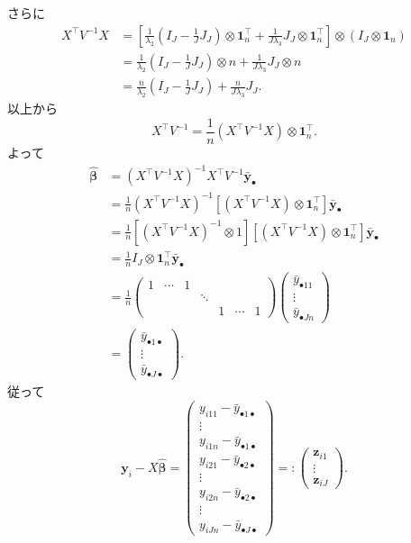 さらに
\begin{align*}
  X^\top V^{-1} X &=
  \left[ \frac{1}{\lambda_2} \left( I_J - \frac{1}{J} J_J \right) \otimes \boldsymbol{1}_n^\top
  + \frac{1}{J\lambda_3} J_J \otimes \boldsymbol{1}_n^\top \right] \otimes (I_J \otimes \boldsymbol{1}_n) \\
  &= \frac{1}{\lambda_2} \left( I_J - \frac{1}{J} J_J \right) \otimes n
  + \frac{1}{J\lambda_3} J_J \otimes n \\
  &= \frac{n}{\lambda_2} \left( I_J - \frac{1}{J} J_J \right) + \frac{n}{J\lambda_3} J_J .
\end{align*}
以上から
\[ X^\top V^{-1} = \frac{1}{n} (X^\top V^{-1} X ) \otimes \boldsymbol{1}_n^\top . \]
よって
\begin{align*}
  \hat{\boldsymbol\beta} &= (X^\top V^{-1}X)^{-1} X^\top V^{-1} \bar{\boldsymbol{y}}_\bullet \\
  &= \frac{1}{n}(X^\top V^{-1}X)^{-1} \left[ (X^\top V^{-1} X ) \otimes \boldsymbol{1}_n^\top \right] \bar{\boldsymbol{y}}_\bullet \\
  &= \frac{1}{n} [(X^\top V^{-1}X)^{-1} \otimes 1] \left[ (X^\top V^{-1} X ) \otimes \boldsymbol{1}_n^\top \right] \bar{\boldsymbol{y}}_\bullet \\
  &= \frac{1}{n} I_J \otimes \boldsymbol{1}_n^\top \bar{\boldsymbol{y}}_\bullet \\
  &= \frac{1}{n}
  \begin{pmatrix}
    1 & \cdots & 1 &&& & \\
    &&& \ddots &&& \\
    &&&& 1 & \cdots & 1
  \end{pmatrix}
  \begin{pmatrix}
    \bar{y}_{\bullet11} \\ \vdots \\ \bar{y}_{\bullet Jn}
  \end{pmatrix}
  \\
  &=
  \begin{pmatrix}
    \bar{y}_{\bullet 1 \bullet} \\ \vdots \\ \bar{y}_{\bullet J \bullet}
  \end{pmatrix} .
\end{align*}
従って
\[
\boldsymbol{y}_i - X \hat{\boldsymbol\beta}
=
\begin{pmatrix}
  y_{i11} - \bar{y}_{\bullet 1 \bullet} \\
  \vdots \\
  y_{i1n} - \bar{y}_{\bullet 1 \bullet} \\ \hline
  y_{i21} - \bar{y}_{\bullet 2 \bullet} \\
  \vdots \\
  y_{i2n} - \bar{y}_{\bullet 2 \bullet} \\ \hline
  \vdots \\
  y_{iJn} - \bar{y}_{\bullet J \bullet}
\end{pmatrix}
=:
\begin{pmatrix}
  \boldsymbol{z}_{i1} \\ \vdots \\  \boldsymbol{z}_{iJ}
\end{pmatrix}
.
\]
